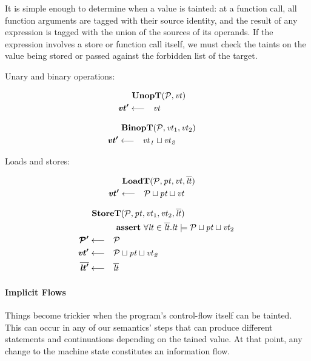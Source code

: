 \documentclass[acmsmall,review,anonymous]{acmart}\settopmatter{printfolios=true,printccs=false,printacmref=false}
\begin{document}
It is simple enough to determine when a value is tainted: at a function
call, all function arguments are tagged with their source identity, and the result
of any expression is tagged with the union of the sources of its operands. If the
expression involves a store or function call itself, we must check the taints on
the value being stored or passed against the forbidden list of the target.

Unary and binary operations:

\begin{minipage}[t]{.49\textwidth}
  \[\begin{aligned}
  \truledef{\unopt}
  \settag{\vt'}{\vt}
  \end{aligned}\]
\end{minipage}
\begin{minipage}[t]{.49\textwidth}
  \[\begin{aligned}
  \truledef{\binopt}
  \settag{\vt'}{
    \vt_1 \sqcup \vt_2
  }
  \end{aligned}\]
\end{minipage}

Loads and stores:

\begin{minipage}[t]{.4\textwidth}
\[\begin{aligned}
\truledef{\loadt}
\settag{\vt'}{\PCT \sqcup \pt \sqcup \vt}
\end{aligned}\]
\end{minipage}
\begin{minipage}[t]{.59\textwidth}
\[\begin{aligned}
\truledef{\storet}
\assert{\forall \lt \in \overline{\lt} . \lt \models \PCT \sqcup \pt \sqcup \vt_2}
\settag{\PCT'}{\PCT}
\settag{\vt'}{\PCT \sqcup \pt \sqcup \vt_2}
\settag{\overline{\lt'}}{\overline{\lt}}
\end{aligned}\]
\end{minipage}

\paragraph{Implicit Flows}

Things become trickier when the program's control-flow itself can be tainted. This can occur in
any of our semantics' steps that can produce different statements and continuations
depending on the tained value. At that point, any change to the machine state constitutes
an information flow.
\end{document}
